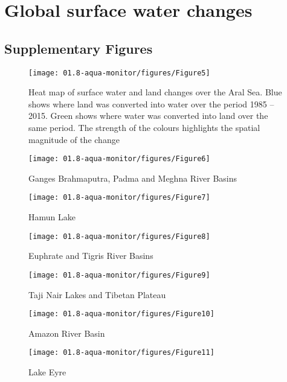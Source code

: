 \chapter{Global surface water changes}

\newpage

\section{Supplementary Figures}

\begin{figure}	
	\centering
	\texttt{[image: 01.8-aqua-monitor/figures/Figure5]}
	\caption{Heat map of surface water and land changes over the Aral Sea. Blue shows where land was converted into water over the period 1985 – 2015. Green shows where water was converted into land over the same period. The strength of the colours highlights the spatial magnitude of the change}
\end{figure}

\begin{figure}
	\centering
	\texttt{[image: 01.8-aqua-monitor/figures/Figure6]}
	\caption{Ganges Brahmaputra, Padma and Meghna River Basins}
\end{figure}

\begin{figure}
	\centering
	\texttt{[image: 01.8-aqua-monitor/figures/Figure7]}
	\caption{Hamun Lake}
\end{figure}

\begin{figure}
	\centering
	\texttt{[image: 01.8-aqua-monitor/figures/Figure8]}
	\caption{Euphrate and Tigris River Basins}
\end{figure}

\begin{figure}
	\centering
	\texttt{[image: 01.8-aqua-monitor/figures/Figure9]}
	\caption{Taji Nair Lakes and Tibetan Plateau}
\end{figure}

\begin{figure}
	\centering
	\texttt{[image: 01.8-aqua-monitor/figures/Figure10]}
	\caption{Amazon River Basin}
\end{figure}

\begin{figure}
	\centering
	\texttt{[image: 01.8-aqua-monitor/figures/Figure11]}
	\caption{Lake Eyre}
\end{figure}

